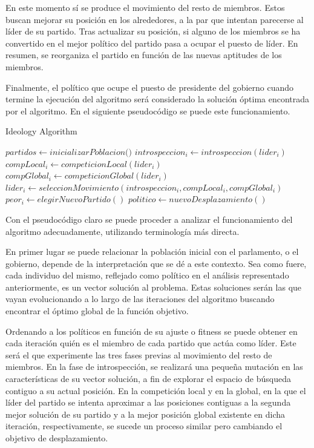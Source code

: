 En este momento sí se produce el movimiento del resto de miembros. Estos buscan mejorar su posición en los alrededores, a la par que intentan parecerse al líder de su partido. Tras actualizar su posición, si alguno de los miembros se ha convertido en el mejor político del partido pasa a ocupar el puesto de líder. En resumen, se reorganiza el partido en función de las nuevas aptitudes de los miembros.

Finalmente, el político que ocupe el puesto de presidente del gobierno cuando termine la ejecución del algoritmo será considerado la solución óptima encontrada por el algoritmo. En el siguiente pseudocódigo se puede este funcionamiento.

\begin{algorithm}
	\caption{Ideology Algorithm}
	\begin{algorithmic}[1]
		\State $partidos \gets \textit{inicializarPoblacion()}$
		\State $introspeccion_i \gets introspeccion(lider_i)$
		\State $compLocal_i \gets competicionLocal(lider_i)$
		\State $compGlobal_i \gets competicionGlobal(lider_i)$
		\State $lider_i \gets seleccionMovimiento(introspeccion_i, compLocal_i, compGlobal_i)$
		\State $peor_i \gets elegirNuevoPartido()$
		\EndIf
		\State $politico \gets nuevoDesplazamiento()$
		\EndFor
		\EndWhile
	\end{algorithmic}
\end{algorithm}

Con el pseudocódigo claro se puede proceder a analizar el funcionamiento del algoritmo adecuadamente, utilizando terminología más directa.

En primer lugar se puede relacionar la población inicial con el parlamento, o el gobierno, depende de la interpretación que se dé a este contexto. Sea como fuere, cada individuo del mismo, reflejado como político en el análisis representado anteriormente, es un vector solución al problema. Estas soluciones serán las que vayan evolucionando a lo largo de las iteraciones del algoritmo buscando encontrar el óptimo global de la función objetivo.

Ordenando a los políticos en función de su ajuste o fitness se puede obtener en cada iteración quién es el miembro de cada partido que actúa como líder. Este será el que experimente las tres fases previas al movimiento del resto de miembros. En la fase de introspección, se realizará una pequeña mutación en las características de su vector solución, a fin de explorar el espacio de búsqueda contiguo a su actual posición. En la competición local y en la global, en la que el líder del partido se intenta aproximar a las posiciones contiguas a la segunda mejor solución de su partido y a la mejor posición global existente en dicha iteración, respectivamente, se sucede un proceso similar pero cambiando el objetivo de desplazamiento.

